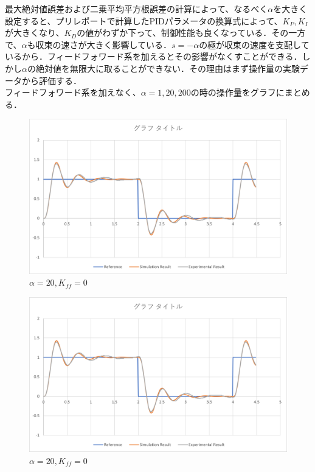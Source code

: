 \documentclass[xelatex,ja=standard,jafont=noto]{bxjsarticle}
\numberwithin{figure}{section}
\begin{document}
最大絶対値誤差および二乗平均平方根誤差の計算によって、なるべく$\alpha$を大きく設定すると、プリレポートで計算したPIDパラメータの換算式によって、$K_{P},K_{I}$が大きくなり、$K_{D}$の値がわずか下って、制御性能も良くなっている．その一方で、$\alpha$も収束の速さが大きく影響している．$s=-\alpha$の極が収束の速度を支配しているから．フィードフォワード系を加えるとその影響がなくすことができる．しかし$\alpha$の絶対値を無限大に取ることができない．その理由はまず操作量の実験データから評価する．\\

フィードフォワード系を加えなく、$\alpha=1,20,200$の時の操作量をグラフにまとめる．



\begin{figure}[h!]
    \centering
    \includegraphics[scale=0.6]{020.png}
    \caption{$\alpha=20,K_{ff}=0$}
\end{figure}

\newpage

\begin{figure}[h!]
    \centering
    \includegraphics[scale=0.6]{020.png}
    \caption{$\alpha=20,K_{ff}=0$}
\end{figure}
\end{document}
